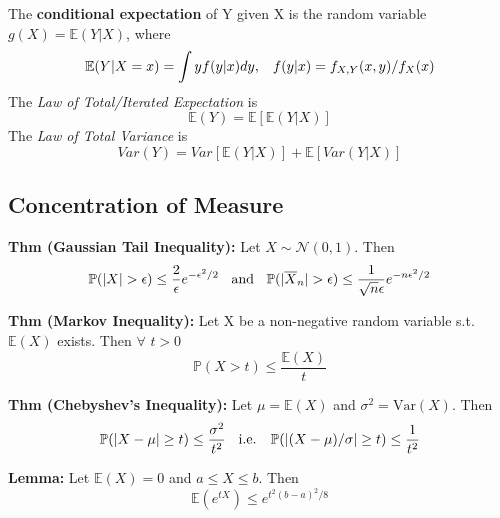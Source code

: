 \documentclass[10pt,twocolumn]{article}
\begin{document}
    The \textbf{conditional expectation} of Y given X is the random variable $g(X) = \mathbb{E}(Y|X)$, where
    \begin{equation}
        \mathbb{E}(Y|X=x) = \int y f(y|x)dy, \hspace{3mm} f(y|x) = f_{X,Y}(x,y) / f_{X}(x)
    \end{equation}
    The \emph{Law of Total/Iterated Expectation} is
    \begin{equation}
    \mathbb{E}(Y) = \mathbb{E}[\mathbb{E}(Y|X)]
    \end{equation}
    The \emph{Law of Total Variance} is
    \begin{equation}
    Var(Y) = Var[\mathbb{E}(Y|X)] + \mathbb{E}[Var(Y|X)]
    \end{equation}

\subsection*{Concentration of Measure}
    \textbf{Thm (Gaussian Tail Inequality):}
    Let $X \sim \mathcal{N}(0,1)$. Then
    \begin{equation}
        \mathbb{P}(|X| > \epsilon) \leq \frac{2}{\epsilon}e^{-\epsilon^{2}/2} \hspace{2mm}\text{ and } \hspace{2mm}
        \mathbb{P}(|\overline{X}_{n}| > \epsilon) \leq \frac{1}{\sqrt{n}\epsilon}e^{-n\epsilon^{2}/2}
    \end{equation}
        
    \textbf{Thm (Markov Inequality):}
    Let X be a non-negative random variable s.t. $\mathbb{E}(X)$ exists. Then $\forall$ $t>0$
    \begin{equation}
        \mathbb{P}(X>t) \leq \frac{\mathbb{E}(X)}{t}
    \end{equation}

    \textbf{Thm (Chebyshev's Inequality):}
    Let $\mu = \mathbb{E}(X)$ and $\sigma^{2} = \text{Var}(X)$. Then
    \begin{equation}
        \mathbb{P}(|X-\mu| \geq t) \leq \frac{\sigma^{2}}{t^{2}} \hspace{2mm} \text{ i.e. } \hspace{2mm}
        \mathbb{P}(|(X-\mu)/\sigma| \geq t) \leq \frac{1}{t^{2}}
    \end{equation}

    \textbf{Lemma:}
    Let $\mathbb{E}(X) = 0$ and $a \leq X \leq b$. Then
    \begin{equation}
        \mathbb{E}(e^{tX}) \leq e^{t^{2}(b-a)^{2}/8}
    \end{equation}
\end{document}
